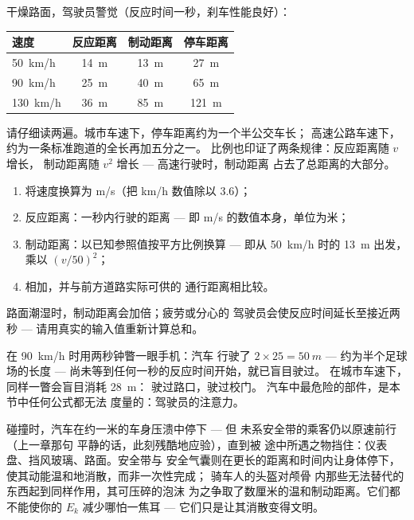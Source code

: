 \begin{example}[每位驾驶员都应掌握的表格]\label{ex:g9:kinetic-energy-safety:table}
干燥路面，驾驶员警觉（反应时间一秒，刹车性能良好）：
\begin{center}
\begin{tabular}{l|c|c|c}
速度 & 反应距离 & 制动距离 & 停车距离 \\
\hline
\qty{50}{km/h} & \qty{14}{m} & \qty{13}{m} & \qty{27}{m} \\
\qty{90}{km/h} & \qty{25}{m} & \qty{40}{m} & \qty{65}{m} \\
\qty{130}{km/h} & \qty{36}{m} & \qty{85}{m} & \qty{121}{m}
\end{tabular}
\end{center}
请仔细读两遍。城市车速下，停车距离约为一个半公交车长；
高速公路车速下，约为一条标准跑道的全长再加五分之一。
比例也印证了两条规律：反应距离随 $v$ 增长，
制动距离随 $v^2$ 增长 --- 高速行驶时，制动距离
占去了总距离的大部分。
\end{example}

\begin{method}[估算停车距离]\label{met:g9:kinetic-energy-safety:estimate}
\begin{enumerate}
  \item 将速度换算为 \unit{m/s}（把 \unit{km/h}
        数值除以 $3.6$）；
  \item 反应距离：一秒内行驶的距离 --- 即
        \unit{m/s} 的数值本身，单位为米；
  \item 制动距离：以已知参照值按平方比例换算 ---
        即从 \qty{50}{km/h} 时的 \qty{13}{m} 出发，乘以
        $(v/50)^2$；
  \item 相加，并与前方道路实际可供的
        通行距离相比较。
\end{enumerate}
路面潮湿时，制动距离会加倍；疲劳或分心的
驾驶员会使反应时间延长至接近两秒 ---
请用真实的输入值重新计算总和。
\end{method}

\begin{example}[一瞥的代价]\label{ex:g9:kinetic-energy-safety:glance}
在 \qty{90}{km/h} 时用两秒钟瞥一眼手机：汽车
行驶了 $2 \times 25 = \qty{50}{m}$ --- 约为半个足球场的长度
--- 尚未等到任何一秒的反应时间开始，就已盲目驶过。
在城市车速下，同样一瞥会盲目消耗 \qty{28}{m}：
驶过路口，驶过校门。
汽车中最危险的部件，是本节中任何公式都无法
度量的：驾驶员的注意力。
\end{example}

\begin{remark}\label{rem:g9:kinetic-energy-safety:belts}
碰撞时，汽车在约一米的车身压溃中停下 --- 但
未系安全带的乘客仍以原速前行（上一章那句
平静的话，此刻残酷地应验），直到被
途中所遇之物挡住：仪表盘、挡风玻璃、路面。安全带与
安全气囊则在更长的距离和时间内让身体停下，
使其动能温和地消散，而非一次性完成；
骑车人的头盔对颅骨
内那些无法替代的东西起到同样作用，其可压碎的泡沫
为之争取了数厘米的温和制动距离。它们都不能使你的
$E_k$ 减少哪怕一焦耳 --- 它们只是让其消散变得文明。
\end{remark}

